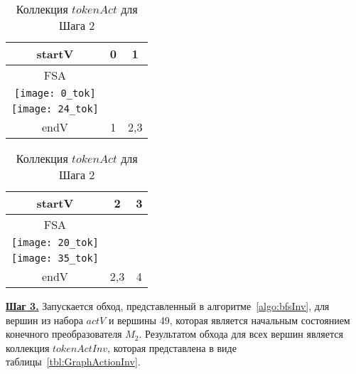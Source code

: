 \documentclass[10pt, conference, compsocconf]{IEEEtran}
\begin{document}
\begin{table}[h]
  \centering
  \begin{tabular}{ | c | c | c | }
    \hline
    startV & 0 & 1 \\ \hline
    FSA
    &
    \begin{minipage}{.15\textwidth}
    \vspace{1 mm} \\
      \texttt{[image: 0\_tok]}
    \end{minipage}
    &
    \begin{minipage}{.15\textwidth}
    \vspace{1 mm} \\
      \texttt{[image: 24\_tok]}
    \end{minipage}
    \\ \hline
    endV & 1 & 2,3 \\ \hline
  \end{tabular}
  
  \vspace{2 mm}
  \begin{tabular}{ | c | c | c | }
    \hline
    startV & 2 & 3 \\ \hline
    FSA
    &
    \begin{minipage}{.15\textwidth}
    \vspace{1 mm} \\
      \texttt{[image: 20\_tok]}
    \end{minipage}
    & 
    \begin{minipage}{.15\textwidth}
    \vspace{1 mm} \\
      \texttt{[image: 35\_tok]}
    \end{minipage}    
    \\ \hline
    endV & 2,3 & 4
    \\ \hline
  \end{tabular}
  \caption{Коллекция $tokenAct$ для Шага 2}
  \label{tbl:GraphAction}
\end{table}


\textbf{\underline{Шаг 3.}} Запускается обход, представленный в алгоритме~\ref{algo:bfsInv}, для вершин из набора $actV$ и вершины 49, которая является начальным состоянием конечного преобразователя $M_2$. Результатом обхода для всех вершин является коллекция $tokenActInv$, которая представлена в виде таблицы~\ref{tbl:GraphActionInv}. 
\end{document}
